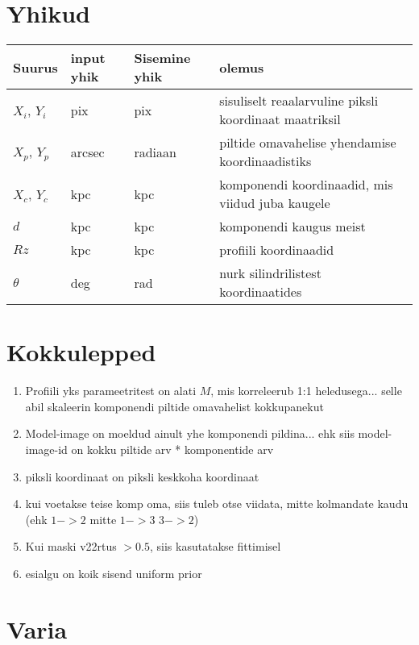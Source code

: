 \documentclass{article}
\begin{document}
	\section{Yhikud} %
	\label{sec:yhikud}
	\begin{tabular}{llll}
		Suurus & input yhik & Sisemine yhik & olemus\\
		\hline
		$X_i$, $Y_i$ & pix & pix & sisuliselt reaalarvuline piksli koordinaat maatriksil\\
		$X_p$, $Y_p$ & arcsec & radiaan & piltide omavahelise yhendamise koordinaadistiks\\
		$X_c$, $Y_c$ & kpc & kpc & komponendi koordinaadid, mis viidud juba kaugele\\
		$d$ & kpc & kpc & komponendi kaugus meist\\
		$Rz$ & kpc & kpc & profiili koordinaadid \\
		$\theta$ & deg & rad & nurk silindrilistest koordinaatides\\
	\end{tabular}
	
	
	
	
	\section{Kokkulepped} %
	\label{sec:kokkulepped}
	\begin{enumerate}
		\item Profiili yks parameetritest on alati $M$, mis korreleerub 1:1 heledusega... selle abil skaleerin komponendi piltide omavahelist kokkupanekut
		\item Model-image on moeldud ainult yhe komponendi pildina... ehk siis model-image-id on kokku piltide arv * komponentide arv
		\item piksli koordinaat on piksli keskkoha koordinaat
		\item kui voetakse teise komp oma, siis tuleb otse viidata, mitte kolmandate kaudu (ehk $1->2$ mitte $1->3$ $3->2$)
		\item Kui maski v22rtus $>0.5$, siis kasutatakse fittimisel
		\item esialgu on koik sisend uniform prior
	\end{enumerate}

	
	
	\section{Varia} %
	\label{sec:varia}
	
\end{document}
